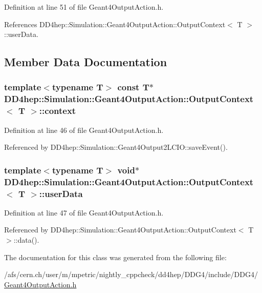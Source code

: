 Definition at line 51 of file Geant4OutputAction.h.

References DD4hep::Simulation::Geant4OutputAction::OutputContext$<$ T $>$::userData.

\subsection{Member Data Documentation}
\hypertarget{class_d_d4hep_1_1_simulation_1_1_geant4_output_action_1_1_output_context_aba6a758066ac2a69e7300ac168bf89b5}{
\subsubsection[{context}]{\setlength{\rightskip}{0pt plus 5cm}template$<$typename T$>$ const T$\ast$ {\bf DD4hep::Simulation::Geant4OutputAction::OutputContext}$<$ T $>$::{\bf context}}}
\label{class_d_d4hep_1_1_simulation_1_1_geant4_output_action_1_1_output_context_aba6a758066ac2a69e7300ac168bf89b5}


Definition at line 46 of file Geant4OutputAction.h.

Referenced by DD4hep::Simulation::Geant4Output2LCIO::saveEvent().\hypertarget{class_d_d4hep_1_1_simulation_1_1_geant4_output_action_1_1_output_context_aac8a4f21a40d123eedfffecd9b6ea96a}{
\subsubsection[{userData}]{\setlength{\rightskip}{0pt plus 5cm}template$<$typename T$>$ void$\ast$ {\bf DD4hep::Simulation::Geant4OutputAction::OutputContext}$<$ T $>$::{\bf userData}}}
\label{class_d_d4hep_1_1_simulation_1_1_geant4_output_action_1_1_output_context_aac8a4f21a40d123eedfffecd9b6ea96a}


Definition at line 47 of file Geant4OutputAction.h.

Referenced by DD4hep::Simulation::Geant4OutputAction::OutputContext$<$ T $>$::data().

The documentation for this class was generated from the following file:\begin{DoxyCompactItemize}
\item 
/afs/cern.ch/user/m/mpetric/nightly\_\-cppcheck/dd4hep/DDG4/include/DDG4/\hyperlink{_geant4_output_action_8h}{Geant4OutputAction.h}\end{DoxyCompactItemize}
